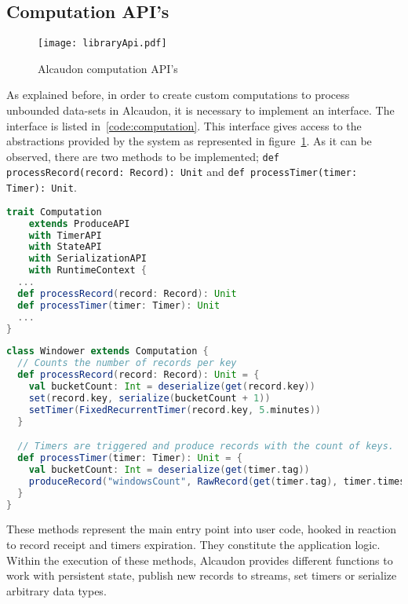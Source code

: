 \subsection{Computation API's}

\begin{figure}[!h]
  \centering
  \texttt{[image: libraryApi.pdf]}
  \caption{Alcaudon computation API's}
  \label{fig:apis}
\end{figure}

As explained before, in order to create custom computations to process unbounded
data-sets in Alcaudon, it is necessary to implement an interface. The interface
is listed in~\ref{code:computation}. This interface gives access to the
abstractions provided by the system as represented in figure~\ref{fig:apis}. As
it can be observed, there are two methods to be implemented;
\lstinline[columns=fixed]{def processRecord(record: Record): Unit} and \lstinline[columns=fixed]{def processTimer(timer: Timer): Unit}.

\begin{lstlisting}[language=scala, frame=trBL, label=code:computation, float=ht, caption = {Computation API's}]
trait Computation
    extends ProduceAPI
    with TimerAPI
    with StateAPI
    with SerializationAPI
    with RuntimeContext {
  ...
  def processRecord(record: Record): Unit
  def processTimer(timer: Timer): Unit
  ...
}
\end{lstlisting}

\begin{lstlisting}[language=scala, frame=trBL, label=code:computationExample, float=ht, caption = {Computation example}]
class Windower extends Computation {
  // Counts the number of records per key
  def processRecord(record: Record): Unit = {
    val bucketCount: Int = deserialize(get(record.key))
    set(record.key, serialize(bucketCount + 1))
    setTimer(FixedRecurrentTimer(record.key, 5.minutes))
  }

  // Timers are triggered and produce records with the count of keys.
  def processTimer(timer: Timer): Unit = {
    val bucketCount: Int = deserialize(get(timer.tag))
    produceRecord("windowsCount", RawRecord(get(timer.tag), timer.timestamp))
  }
}
\end{lstlisting}

These methods represent the main entry point into user code, hooked in reaction to
record receipt and timers expiration. They constitute the application logic.
Within the execution of these methods, Alcaudon provides different functions to
work with persistent state, publish new records to streams, set timers or
serialize arbitrary data types.

